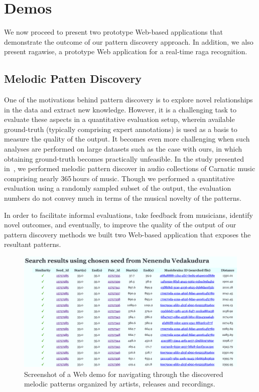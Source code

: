 \section{Demos}

We now proceed to present two prototype Web-based applications that demonstrate the outcome of our pattern discovery approach. In addition, we also present ragawise, a prototype Web application for a real-time raga recognition. 

\subsection*{Melodic Patten Discovery}

One of the motivations behind pattern discovery is to explore novel relationships in the data and extract new knowledge. However, it is a challenging task to evaluate these aspects  in a quantitative evaluation setup, wherein available ground-truth (typically comprising expert annotations) is used as a basis to measure the quality of the output. It becomes even more challenging when such analyses are performed on large datasets such as the case with ours, in which obtaining ground-truth becomes practically unfeasible.  In the study presented in~\secref{}, we performed melodic pattern discover in audio collections of Carnatic music comprising nearly 365\,hours of music. Though we performed a quantitative evaluation using a randomly sampled subset of the output, the evaluation numbers do not convey much in terms of the musical novelty of the patterns. 

In order to facilitate informal evaluations, take feedback from musicians, identify novel outcomes, and eventually, to improve the quality of the output of our pattern discovery methods we built two Web-based application that exposes the resultant patterns. 

\begin{figure}
	\begin{center}
		\includegraphics[width=\figSizeHundred]{ch08_applications/figures/patternBrowsing1.png}
	\end{center}
	\caption{Screenshot of a Web demo for navigating through the discovered melodic patterns organized by artists, releases and recordings.}
	\label{fig:browser_patterns}
\end{figure}

